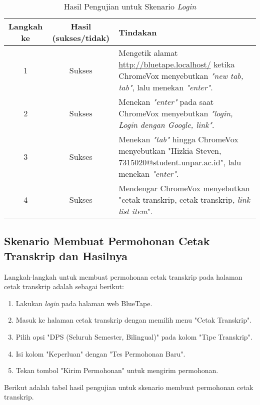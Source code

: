 \begin{table}[H]
    \centering 
    \caption{Hasil Pengujian untuk Skenario \textit{Login}}
    \label{tab:hasil_pengujian_login}
    \begin{tabular}{|c|c|p{10cm}|}
        \toprule
        Langkah ke & Hasil (sukses/tidak) & Tindakan \\

        \midrule
        1 & Sukses & Mengetik alamat \url{http://bluetape.localhost/} ketika ChromeVox menyebutkan \textit{"new tab, tab"}, lalu menekan \textit{"enter"}. \\
        2 & Sukses & Menekan \textit{"enter"} pada saat ChromeVox menyebutkan \textit{"login, Login dengan Google, link"}. \\
        3 & Sukses & Menekan \textit{"tab"} hingga ChromeVox menyebutkan "Hizkia Steven, 7315020@student.unpar.ac.id", lalu menekan \textit{"enter"}. \\
        4 & Sukses & Mendengar ChromeVox menyebutkan "cetak transkrip, cetak transkrip, \textit{link list item}". \\

        \bottomrule

    \end{tabular}
\end{table}

\subsection{Skenario Membuat Permohonan Cetak Transkrip dan Hasilnya}
\label{subsec:skenario_membuat_permohonan_cetak_transkrip}
Langkah-langkah untuk membuat permohonan cetak transkrip pada halaman cetak transkrip adalah sebagai berikut:

\begin{enumerate}
    \item Lakukan \textit{login} pada halaman web BlueTape.
    \item Masuk ke halaman cetak transkrip dengan memilih menu "Cetak Transkrip".
    \item Pilih opsi "DPS (Seluruh Semester, Bilingual)" pada kolom "Tipe Transkrip".
    \item Isi kolom "Keperluan" dengan "Tes Permohonan Baru".
    \item Tekan tombol "Kirim Permohonan" untuk mengirim permohonan.
\end{enumerate}

Berikut adalah tabel hasil pengujian untuk skenario membuat permohonan cetak transkrip.

